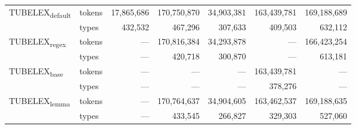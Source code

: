 \begin{tabular}{llrrrrr}
\multirow[c]{2}{*}{TUBELEX\textsubscript{default}} & tokens & 17,865,686 & 170,750,870 & 34,903,381 & 163,439,781 & 169,188,689 \\
 & \cellcolor[HTML]{EEEEEE} types & \cellcolor[HTML]{EEEEEE} 432,532 & \cellcolor[HTML]{EEEEEE} 467,296 & \cellcolor[HTML]{EEEEEE} 307,633 & \cellcolor[HTML]{EEEEEE} 409,503 & \cellcolor[HTML]{EEEEEE} 632,112 \\
\multirow[c]{2}{*}{TUBELEX\textsubscript{regex}} & tokens & --- & 170,816,384 & 34,293,878 & --- & 166,423,254 \\
 & \cellcolor[HTML]{EEEEEE} types & \cellcolor[HTML]{EEEEEE} --- & \cellcolor[HTML]{EEEEEE} 420,718 & \cellcolor[HTML]{EEEEEE} 300,870 & \cellcolor[HTML]{EEEEEE} --- & \cellcolor[HTML]{EEEEEE} 613,181 \\
\multirow[c]{2}{*}{TUBELEX\textsubscript{base}} & tokens & --- & --- & --- & 163,439,781 & --- \\
 & \cellcolor[HTML]{EEEEEE} types & \cellcolor[HTML]{EEEEEE} --- & \cellcolor[HTML]{EEEEEE} --- & \cellcolor[HTML]{EEEEEE} --- & \cellcolor[HTML]{EEEEEE} 378,276 & \cellcolor[HTML]{EEEEEE} --- \\
\multirow[c]{2}{*}{TUBELEX\textsubscript{lemma}} & tokens & --- & 170,764,637 & 34,904,605 & 163,462,537 & 169,188,635 \\
 & \cellcolor[HTML]{EEEEEE} types & \cellcolor[HTML]{EEEEEE} --- & \cellcolor[HTML]{EEEEEE} 433,545 & \cellcolor[HTML]{EEEEEE} 266,827 & \cellcolor[HTML]{EEEEEE} 329,303 & \cellcolor[HTML]{EEEEEE} 527,060 \\
\bottomrule
\end{tabular}
